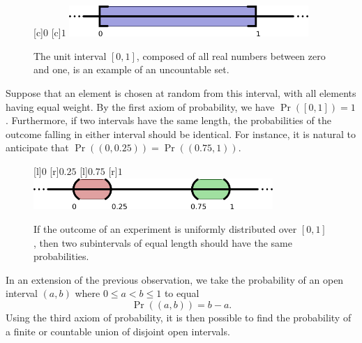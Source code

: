 \begin{figure}[htb!]
\begin{center}
\begin{psfrags}
[c]{$0$}
[c]{$1$}
\includegraphics[height=1.17cm]{Figures/2Chapter/uncountablespace}
\end{psfrags}
\caption{The unit interval $[0,1]$, composed of all real numbers between zero and one, is an example of an uncountable set.}
\end{center}
\end{figure}

Suppose that an element is chosen at random from this interval, with all elements having equal weight.
By the first axiom of probability, we have $\Pr \left( [0,1] \right) = 1$.
Furthermore, if two intervals have the same length, the probabilities of the outcome falling in either interval should be identical.
For instance, it is natural to anticipate that $\Pr \left( \left( 0, 0.25 \right) \right) = \Pr \left( \left( 0.75, 1 \right) \right)$.

\begin{figure}[htb!]
\begin{center}
\begin{psfrags}
[l]{$0$}
[r]{$0.25$}
[l]{$0.75$}
[r]{$1$}
\includegraphics[height=1.185cm]{Figures/2Chapter/intervals}
\end{psfrags}
\caption{If the outcome of an experiment is uniformly distributed over $[0,1]$, then two subintervals of equal length should have the same probabilities.}
\end{center}
\end{figure}

In an extension of the previous observation, we take the probability of an open interval $(a, b)$ where $0 \leq a < b \leq 1$ to equal
\begin{equation} \label{equation:DefinitionProbabilityLaw1}
\Pr ( (a,b) ) = b - a .
\end{equation}
Using the third axiom of probability, it is then possible to find the probability of a finite or countable union of disjoint open intervals.


